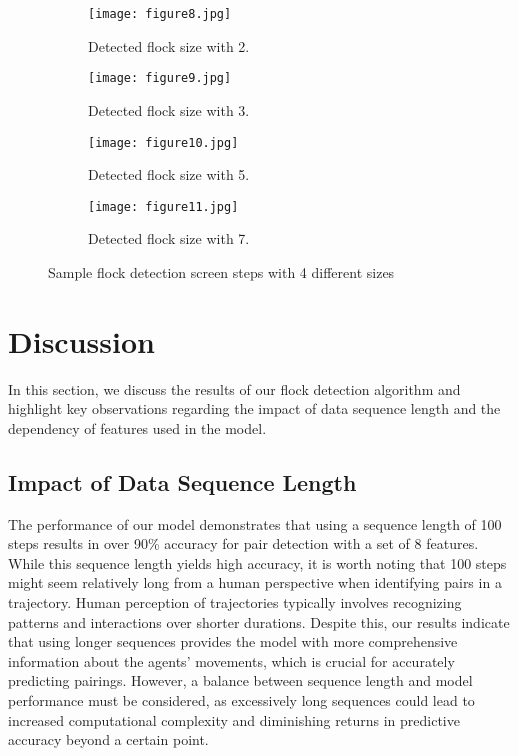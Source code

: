 \documentclass{article}
\begin{document}
\begin{figure}[H]
    \centering
    \ifpdf
        \begin{subfigure}[c]{0.45\textwidth} 
            \centering
            \texttt{[image: figure8.jpg]}
            \caption{Detected flock size with 2.}
            \label{fig:flock2}
        \end{subfigure}
    \fi
    \hfill
    \begin{subfigure}[c]{0.45\textwidth}
        \centering
        \texttt{[image: figure9.jpg]}
        \caption{Detected flock size with 3.}
        \label{fig:flock3}
    \end{subfigure}

    \begin{subfigure}[c]{0.45\textwidth}
        \centering
        \texttt{[image: figure10.jpg]}
        \caption{Detected flock size with 5.}
        \label{fig:flock5}
    \end{subfigure}
    \hfill
    \begin{subfigure}[c]{0.45\textwidth}
        \centering
        \texttt{[image: figure11.jpg]}
        \caption{Detected flock size with 7.}
        \label{fig:flock7}
    \end{subfigure}

    \caption{Sample flock detection screen steps with 4 different sizes}
    \label{fig:flock_detection}
\end{figure}


\section{Discussion}

In this section, we discuss the results of our flock detection algorithm and highlight key observations regarding the impact of data sequence length and the dependency of features used in the model.

\subsection*{Impact of Data Sequence Length}
The performance of our model demonstrates that using a sequence length of 100 steps results in over 90\% accuracy for pair detection with a set of 8 features. While this sequence length yields high accuracy, it is worth noting that 100 steps might seem relatively long from a human perspective when identifying pairs in a trajectory. Human perception of trajectories typically involves recognizing patterns and interactions over shorter durations. Despite this, our results indicate that using longer sequences provides the model with more comprehensive information about the agents' movements, which is crucial for accurately predicting pairings. However, a balance between sequence length and model performance must be considered, as excessively long sequences could lead to increased computational complexity and diminishing returns in predictive accuracy beyond a certain point.
\end{document}
